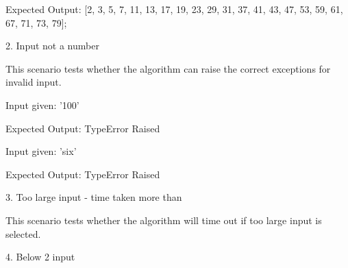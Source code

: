 \documentclass[12pt]{article}
\begin{document}
\begin{justify}
Expected Output: [2, 3, 5, 7, 11, 13, 17, 19, 23, 29, 31, 37, 41, 43, 47, 53, 59, 61, 67, 71, 73, 79];
\end{justify}\par


\vspace{\baselineskip}
\begin{justify}
2. Input not a number
\end{justify}\par

\begin{justify}
This scenario tests whether the algorithm can raise the correct exceptions for invalid input.
\end{justify}\par

\begin{justify}
Input given: '100'
\end{justify}\par

\begin{justify}
Expected Output: TypeError Raised
\end{justify}\par

\begin{justify}
Input given: 'six'
\end{justify}\par

\begin{justify}
Expected Output: TypeError Raised
\end{justify}\par


\vspace{\baselineskip}
\begin{justify}
3. Too large input - time taken more than
\end{justify}\par

\begin{justify}
 This scenario tests whether the algorithm will time out if too large input is selected.
\end{justify}\par


\vspace{\baselineskip}
\begin{justify}
4. Below 2 input
\end{justify}\par
\end{document}
